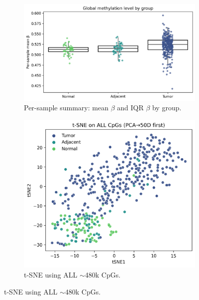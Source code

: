 \documentclass[10pt]{extarticle}
\begin{document}
\begin{figure}[H]
    \begin{subfigure}[t]{0.48\textwidth}
        \centering
        \includegraphics[height=\panelheight, width=\linewidth, keepaspectratio]{Figures/plot_1_4_Per_sample_summary_mean_β_and_IQR_β_by_group.png}
        \caption{Per-sample summary: mean $\beta$ and IQR $\beta$ by group.}
        \label{fig:vispanel1c}
    \end{subfigure}
    \hfill
    \begin{subfigure}[t]{0.48\textwidth}
        \centering
        \includegraphics[height=\panelheight, width=\linewidth, keepaspectratio]{Figures/plot_4_1_t_SNE_using_ALL_CpGs_PCA_t_SNE.png}
        \caption{t-SNE using ALL $\sim$480k CpGs.}
        \label{fig:vispanel1d}
    \end{subfigure}


\end{figure}
\end{document}
